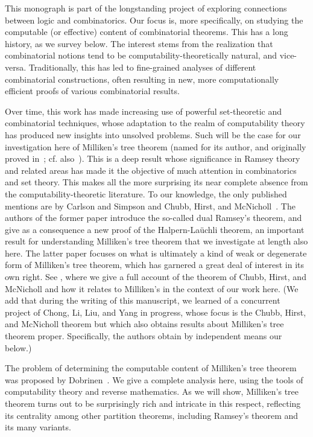This monograph is part of the longstanding project of exploring connections between logic and combinatorics. Our focus is, more specifically, on studying the computable (or effective) content of combinatorial theorems. This has a long history, as we survey below. The interest stems from the realization that combinatorial notions tend to be computability-theoretically natural, and vice-versa. Traditionally, this has led to fine-grained analyses of different combinatorial constructions, often resulting in new, more computationally efficient proofs of various combinatorial results.

Over time, this work has made increasing use of powerful set-theoretic and combinatorial techniques, whose adaptation to the realm of computability theory has produced new insights into unsolved problems. Such will be the case for our investigation here of Milliken's tree theorem (named for its author, and originally proved in~\cite{Milliken1979RTforTrees}; cf. also~\cite{Milliken1881}). This is a deep result whose significance in Ramsey theory and related areas has made it the objective of much attention in combinatorics and set theory. This makes all the more surprising its near complete absence from the computability-theoretic literature. To our knowledge, the only published mentions are by Carlson and Simpson \cite[Section 3]{Carlson1984dual} and Chubb, Hirst, and McNicholl~\cite{Chubb2009Reverse}. The authors of the former paper introduce the so-called dual Ramsey's theorem, and give as a consequence a new proof of the Halpern-La\"{u}chli theorem, an important result for understanding Milliken's tree theorem that we investigate at length also here. The latter paper focuses on what is ultimately a kind of weak or degenerate form of Milliken's tree theorem, which has garnered a great deal of interest in its own right. See , where we give a full account of the theorem of Chubb, Hirst, and McNicholl and how it relates to Milliken's in the context of our work here. (We add that during the writing of this manuscript, we learned of a concurrent project of Chong, Li, Liu, and Yang in progress, whose focus is the Chubb, Hirst, and McNicholl theorem but which also obtains results about Milliken's tree theorem proper. Specifically, the authors obtain by independent means our  below.)

The problem of determining the computable content of Milliken's tree theorem was proposed by Dobrinen~\cite{Dobrinen-2018}. We give a complete analysis here, using the tools of computability theory and reverse mathematics. As we will show, Milliken's tree theorem turns out to be surprisingly rich and intricate in this respect, reflecting its centrality among other partition theorems, including Ramsey's theorem and its many variants.

